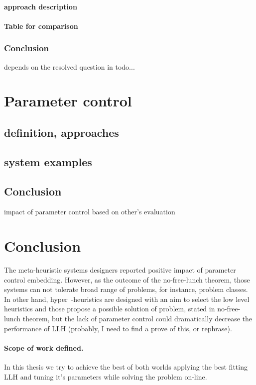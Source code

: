 \paragraph{approach description}


\paragraph{Table for comparison}

\subsubsection{Conclusion}
depends on the resolved question in todo...


\section{Parameter control}\label{bg: parameter control}
\subsection{definition, approaches}
\subsection{system examples}
\subsection{Conclusion} impact of parameter control based on other's evaluation


\section{Conclusion}

The meta-heuristic systems designers reported positive impact of parameter control embedding. 
However, as the outcome of the no-free-lunch theorem, those systems can not tolerate broad range of problems, for instance, problem classes.
In other hand, hyper~-heuristics are designed with an aim to select the low level heuristics and those propose a possible solution of problem, stated in no-free-lunch theorem, but the lack of parameter control could dramatically decrease the performance of LLH (probably, I need to find a prove of this, or rephrase).

\paragraph{Scope of work defined.} In this thesis we try to achieve the best of both worlds applying the best fitting LLH and tuning it's parameters while solving the problem on-line.
